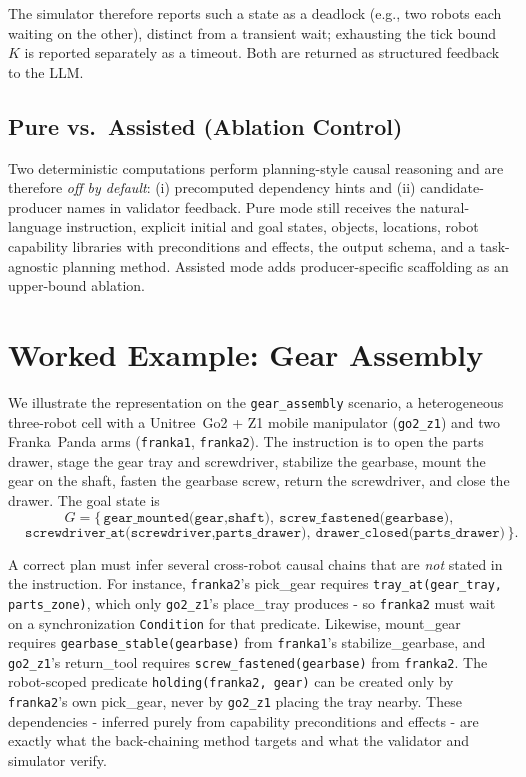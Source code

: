 \documentclass[journal]{IEEEtran}
\newcommand{\pred}[1]{\texttt{#1}}
\newcommand{\act}[1]{\textsf{#1}}
\begin{document}
The simulator therefore reports such a state as a deadlock (e.g., two robots each waiting on the other), distinct from a transient wait; exhausting the tick bound $K$ is reported separately as a timeout. Both are returned as structured feedback to the LLM.

\subsection{Pure vs.\ Assisted (Ablation Control)}
Two deterministic computations perform planning-style causal reasoning and are therefore \emph{off by default}: (i) precomputed dependency hints and (ii) candidate-producer names in validator feedback. Pure mode still receives the natural-language instruction, explicit initial and goal states, objects, locations, robot capability libraries with preconditions and effects, the output schema, and a task-agnostic planning method. Assisted mode adds producer-specific scaffolding as an upper-bound ablation.

\section{Worked Example: Gear Assembly}
\label{sec:example}
We illustrate the representation on the \texttt{gear\_assembly} scenario, a heterogeneous three-robot cell with a Unitree~Go2 + Z1 mobile manipulator (\texttt{go2\_z1}) and two Franka~Panda arms (\texttt{franka1}, \texttt{franka2}). The instruction is to open the parts drawer, stage the gear tray and screwdriver, stabilize the gearbase, mount the gear on the shaft, fasten the gearbase screw, return the screwdriver, and close the drawer. The goal state is
\begin{equation*}
G = \{\,\pred{gear\_mounted(gear,shaft)},\ \pred{screw\_fastened(gearbase)},
\end{equation*}
\vspace{-1.4em}
\begin{equation*}
\quad\ \pred{screwdriver\_at(screwdriver,parts\_drawer)},\ \pred{drawer\_closed(parts\_drawer)}\,\}.
\end{equation*}

A correct plan must infer several cross-robot causal chains that are \emph{not} stated in the instruction. For instance, \texttt{franka2}'s \act{pick\_gear} requires \pred{tray\_at(gear\_tray, parts\_zone)}, which only \texttt{go2\_z1}'s \act{place\_tray} produces - so \texttt{franka2} must wait on a synchronization \pred{Condition} for that predicate. Likewise, \act{mount\_gear} requires \pred{gearbase\_stable(gearbase)} from \texttt{franka1}'s \act{stabilize\_gearbase}, and \texttt{go2\_z1}'s \act{return\_tool} requires \pred{screw\_fastened(gearbase)} from \texttt{franka2}. The robot-scoped predicate \pred{holding(franka2, gear)} can be created only by \texttt{franka2}'s own \act{pick\_gear}, never by \texttt{go2\_z1} placing the tray nearby. These dependencies - inferred purely from capability preconditions and effects - are exactly what the back-chaining method targets and what the validator and simulator verify.
\end{document}
